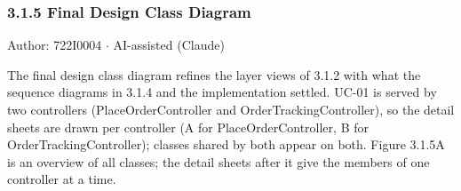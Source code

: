 \subsubsection*{3.1.5 Final Design Class Diagram}
Author: 722I0004 \ensuremath{\cdot} AI-assisted (Claude)

The final design class diagram refines the layer views of 3.1.2 with what the sequence diagrams in 3.1.4 and the implementation settled. UC-01 is served by two controllers (PlaceOrderController and OrderTrackingController), so the detail sheets are drawn per controller (A for PlaceOrderController, B for OrderTrackingController); classes shared by both appear on both. Figure 3.1.5A is an overview of all classes; the detail sheets after it give the members of one controller at a time.

